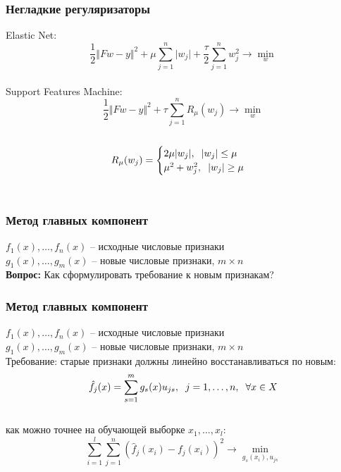 \documentclass[12pt]{beamer}
\begin{document}
\begin{frame}\frametitle{Негладкие регуляризаторы}
Elastic Net:\\
$$\frac{1}{2} \Vert Fw - y \Vert^2 + \mu \sum\limits_{j=1}^n \vert w_j \vert + \frac{\tau}{2} \sum\limits_{j=1}^n w_j^2 \rightarrow \min\limits_{w}$$\\
Support Features Machine:\\
$$\frac{1}{2} \Vert Fw - y \Vert^2 + \tau \sum\limits_{j=1}^n R_{\mu}(w_j) \rightarrow \min\limits_{w}$$\\
$$ R_{\mu}(w_j) = \begin{cases} 2 \mu \vert w_j \vert, \hspace{2mm} \vert w_j \vert \leq \mu\\
\mu^2 + w_j^2, \hspace{2mm} \vert w_j \vert \geq \mu
\end{cases}$$\\
\end{frame}

\begin{frame}\frametitle{Метод главных компонент}
$f_1(x), \dots, f_n(x)$ -- исходные числовые признаки\\
$g_1(x), \dots, g_m(x)$ -- новые числовые признаки, $m \times n$\\
\vspace{5mm}
\textbf{Вопрос:} Как сформулировать требование к новым признакам?
\end{frame}


\begin{frame}\frametitle{Метод главных компонент}
$f_1(x), \dots, f_n(x)$ -- исходные числовые признаки\\
$g_1(x), \dots, g_m(x)$ -- новые числовые признаки, $m \times n$\\
Требование: старые признаки должны линейно
восстанавливаться по новым:\\
$$\hat{f}_j(x) = \sum\limits_{s=1}^m g_s(x) u_{js} , \hspace{2mm} j = 1,\dots , n, \hspace{2mm} \forall x \in X$$\\
как можно точнее на обучающей выборке $x_1, \dots, x_l$:\\
$$\sum\limits_{i=1}^l \sum\limits_{j=1}^n (\hat{f}_j(x_i) - f_j(x_i))^2 \rightarrow \min\limits_{g_s(x_i), u_{js}}$$
\end{frame}
\end{document}
